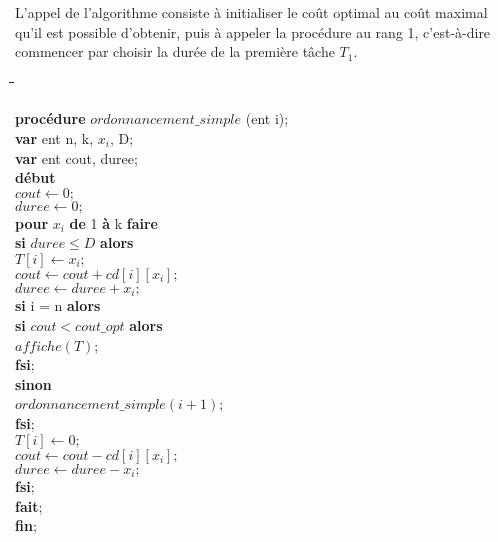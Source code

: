 \documentclass[a4paper, titlepage]{article}
\begin{document}
			L'appel de l'algorithme consiste à initialiser le coût optimal au coût maximal qu'il est possible d'obtenir, puis à appeler la procédure au rang 1, c'est-à-dire commencer par choisir la durée de la première tâche $T_{1}$.

			\begin{tabbing}

			\hspace{1cm}\=\hspace{1cm}\=\hspace{1cm}\=\hspace{1cm}\=\hspace{1cm}\=\kill %

			\textbf{procédure} $ordonnancement\_simple$ (ent i); \\
			\textbf{var} ent n, k, $x_{i}$, D; \\
			\textbf{var} ent cout, duree; \\
			\textbf{début} \\
			\> $cout \leftarrow 0;$ \\
			\> $duree \leftarrow 0;$ \\
			\> \textbf{pour} $x_{i}$ \textbf{de} 1 \textbf{à} k \textbf{faire} \\
			\>\> \textbf{si} $duree\le D$ \textbf{alors} \\
			\>\>\> $T[i] \leftarrow x_{i};$ \\
			\>\>\> $cout \leftarrow cout + cd[i][x_{i}];$ \\
			\>\>\> $duree \leftarrow duree + x_{i};$ \\

			\>\>\> \textbf{si} i = n \textbf{alors} \\
			\>\>\>\> \textbf{si} $cout < cout\_opt$ \textbf{alors} \\
			\>\>\>\>\> $affiche(T)$; \\
			\>\>\>\> \textbf{fsi}; \\

			\>\>\> \textbf{sinon} \\
			\>\>\>\> $ordonnancement\_simple(i+1)$; \\
			\>\>\> \textbf{fsi}; \\

			\>\>\> $T[i] \leftarrow 0;$ \\
			\>\>\> $cout \leftarrow cout - cd[i][x_{i}];$ \\
			\>\>\> $duree \leftarrow duree - x_{i};	$ \\
			\>\> \textbf{fsi}; \\
			\> \textbf{fait}; \\
			\textbf{fin};

			\end{tabbing}
\end{document}
